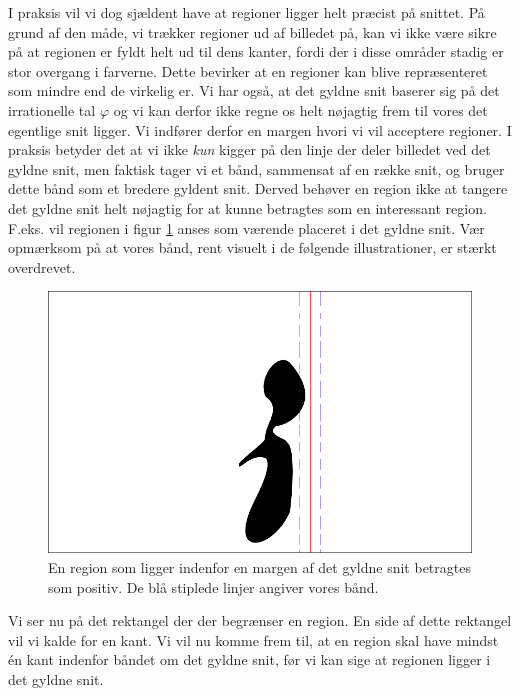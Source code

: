 {I praksis vil vi dog sjældent have at regioner ligger helt præcist på
snittet.  På grund af den måde, vi trækker regioner ud af billedet på,
kan vi ikke være sikre på at regionen er fyldt helt ud til dens kanter,
fordi der i disse områder stadig er stor overgang i farverne.  Dette
bevirker at en regioner kan blive repræsenteret som mindre end de
virkelig er.  Vi har også, at det gyldne snit baserer sig på det
irrationelle tal $\varphi$ og vi kan derfor ikke regne os helt nøjagtig
frem til vores det egentlige snit ligger. Vi indfører derfor en margen
hvori vi vil acceptere regioner. I praksis betyder det at vi ikke
\emph{kun} kigger på den linje der deler billedet ved det gyldne snit,
men faktisk tager vi et bånd, sammensat af en række snit, og bruger
dette bånd som et bredere gyldent snit.  Derved behøver en region ikke
at tangere det gyldne snit helt nøjagtig for at kunne betragtes som en
interessant region. F.eks. vil regionen i figur \ref{pos_naiv_margin_1}
anses som værende placeret i det gyldne snit. Vær opmærksom på at vores
bånd, rent visuelt i de følgende illustrationer, er stærkt overdrevet.
\begin{figure}[h]
	\begin{center}
		\includegraphics[scale=\imgscale,angle=0]{afsnit/vores_implementation/billeder/naiv_algoritme/naiv_positiv_blob_margin_1}
	\end{center}
	\caption[Positiv region i margen]{En region som
	ligger indenfor en margen af det gyldne snit betragtes som
	positiv. De blå stiplede linjer angiver vores bånd.}
	\label{pos_naiv_margin_1}
\end{figure}

Vi ser nu på det rektangel der der begrænser en region.  En side af
dette rektangel vil vi kalde for en kant. Vi vil nu komme frem til, at
en region skal have mindst én kant indenfor båndet om det gyldne snit,
før vi kan sige at regionen ligger i det gyldne snit.

}
